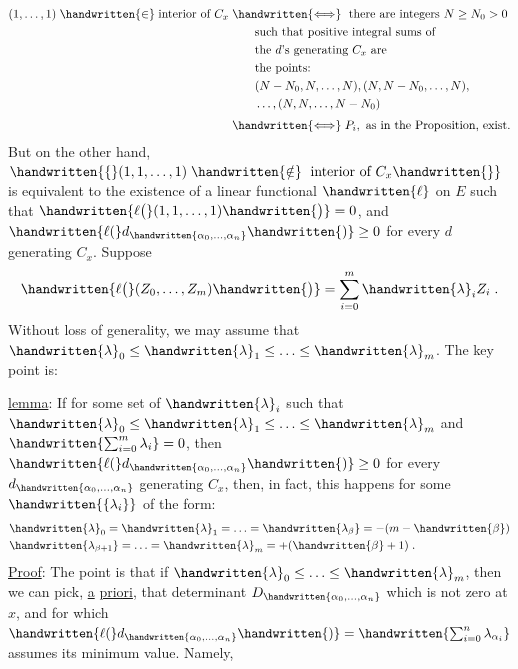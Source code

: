 \[
\begin{aligned}
(1,\ldots,1)\mathrel{\handwritten{\in}}\text{interior of }C_x
&\mathrel{\handwritten{\Longleftrightarrow}}\text{ there are integers } N\geq N_0>0\\
&\phantom{\Longleftrightarrow}\text{ such that positive integral sums of}\\
&\phantom{\Longleftrightarrow}\text{ the }d\text{'s generating }C_x\text{ are}\\
&\phantom{\Longleftrightarrow}\text{ the points:}\\
&\phantom{\Longleftrightarrow}\ (N-N_0,N,\ldots,N),(N,N-N_0,\ldots,N),\\
&\phantom{\Longleftrightarrow}\ \ldots,(N,N,\ldots,N-N_0)\\[3pt]
&\mathrel{\handwritten{\Longleftrightarrow}}P_i,\text{ as in the Proposition, exist.}
\end{aligned}
\]
But on the other hand, $\handwritten{\{}(1,1,\ldots,1)\mathrel{\handwritten{\notin}}\text{ interior of }C_x\handwritten{\}}$ is equivalent to the existence of a linear functional $\handwritten{\ell}$ on $E$ such that $\handwritten{\ell\bigl(}(1,1,\ldots,1)\handwritten{\bigr)}=0$, and $\handwritten{\ell(}d_{\handwritten{\alpha_0,\ldots,\alpha_n}}\handwritten{)}\geq0$ for every $d$ generating $C_x$. Suppose
\[
\handwritten{\ell\bigl(}(Z_0,\ldots,Z_m)\handwritten{\bigr)}=\sum_{i=0}^{m}\handwritten{\lambda}_i Z_i\;.
\]
Without loss of generality, we may assume that $\handwritten{\lambda}_0\leq\handwritten{\lambda}_1\leq\ldots\leq\handwritten{\lambda}_m$. The key point is:

\uline{lemma}: If for some set of $\handwritten{\lambda}_i$ such that $\handwritten{\lambda}_0\leq\handwritten{\lambda}_1\leq\ldots\leq\handwritten{\lambda}_m$ and $\handwritten{\sum_{i=0}^{m}\lambda_i}=0$, then $\handwritten{\ell(}d_{\handwritten{\alpha_0,\ldots,\alpha_n}}\handwritten{)}\geq0$ for every $d_{\handwritten{\alpha_0,\ldots,\alpha_n}}$ generating $C_x$, then, in fact, this happens for some $\handwritten{\{\lambda_i\}}$ of the form:
\[
\begin{aligned}
&\handwritten{\lambda}_0=\handwritten{\lambda}_1=\ldots=\handwritten{\lambda_\beta}=-(m-\handwritten{\beta})\\
&\handwritten{\lambda_{\beta+1}}=\ldots=\handwritten{\lambda}_m=+(\handwritten{\beta}+1)\;.
\end{aligned}
\]
\uline{Proof}: The point is that if $\handwritten{\lambda}_0\leq\ldots\leq\handwritten{\lambda}_m$, then we can pick, \uline{a} \uline{priori}, that determinant $D_{\handwritten{\alpha_0,\ldots,\alpha_n}}$ which is not zero at $x$, and for which $\handwritten{\ell(}d_{\handwritten{\alpha_0,\ldots,\alpha_n}}\handwritten{)}=\handwritten{\sum_{i=0}^{n}\lambda_{\alpha_i}}$ assumes its minimum value. Namely,

